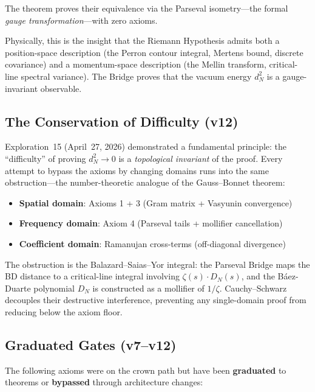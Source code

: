 \documentclass[11pt,a4paper]{article}
\begin{document}
The  theorem proves their equivalence
via the Parseval isometry---the formal \emph{gauge transformation}---with
zero axioms.

Physically, this is the insight that the Riemann Hypothesis admits both
a position-space description (the Perron contour integral, Mertens bound,
discrete covariance) and a momentum-space description (the Mellin
transform, critical-line spectral variance). The Bridge proves that
the vacuum energy $d_N^2$ is a gauge-invariant observable.

\subsection{The Conservation of Difficulty (v12)}

Exploration~15 (April~27, 2026) demonstrated a fundamental principle:
the ``difficulty'' of proving $d_N^2 \to 0$ is a
\emph{topological invariant} of the proof. Every attempt to bypass
the axioms by changing domains runs into the same obstruction---the
number-theoretic analogue of the Gauss--Bonnet theorem:

\begin{itemize}
  \item \textbf{Spatial domain}: Axioms 1 + 3 (Gram matrix + Vasyunin convergence)
  \item \textbf{Frequency domain}: Axiom 4 (Parseval tails + mollifier cancellation)
  \item \textbf{Coefficient domain}: Ramanujan cross-terms (off-diagonal divergence)
\end{itemize}

The obstruction is the Balazard--Saias--Yor integral: the Parseval Bridge
maps the BD distance to a critical-line integral involving $\zeta(s) \cdot D_N(s)$,
and the B\'aez-Duarte polynomial $D_N$ is constructed as a mollifier of
$1/\zeta$. Cauchy--Schwarz decouples their destructive interference,
preventing any single-domain proof from reducing below the axiom floor.

\subsection{Graduated Gates (v7--v12)}

The following axioms were on the crown path but have been \textbf{graduated}
to theorems or \textbf{bypassed} through architecture changes:
\end{document}
